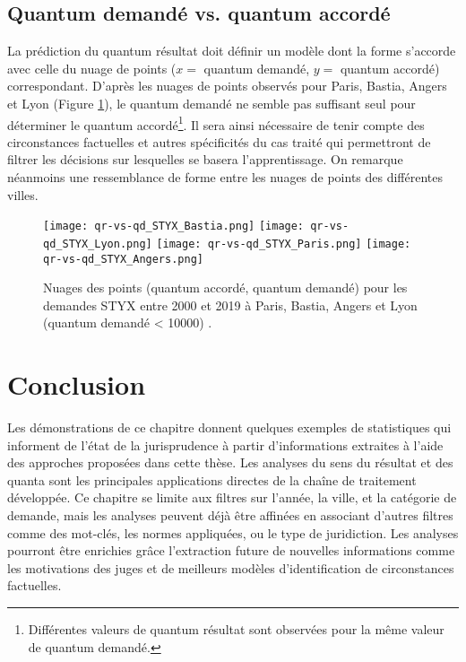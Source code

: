 \subsection{Quantum demandé vs. quantum accordé}
La prédiction du quantum résultat doit définir un modèle dont la forme s'accorde avec celle du nuage de points ($x=$ quantum demandé, $y=$ quantum accordé) correspondant. D'après les nuages de points observés pour Paris, Bastia, Angers et Lyon (Figure \ref{fig:demo:qr-vs-qd-styx-compare-ville}), le quantum demandé ne semble pas suffisant seul pour déterminer le quantum accordé\footnote{Différentes valeurs de quantum résultat sont observées pour la même valeur de quantum demandé.}. Il sera ainsi nécessaire de tenir compte des circonstances factuelles et autres spécificités du cas traité qui permettront de filtrer les décisions sur lesquelles se basera l'apprentissage. On remarque néanmoins une ressemblance de forme entre les nuages de points des différentes villes. 

\begin{figure}[!htb]
	\centering 
	\texttt{[image: qr-vs-qd\_STYX\_Bastia.png]}
	\texttt{[image: qr-vs-qd\_STYX\_Lyon.png]}
	\texttt{[image: qr-vs-qd\_STYX\_Paris.png]}
	\texttt{[image: qr-vs-qd\_STYX\_Angers.png]}
	\caption{Nuages des points (quantum accordé, quantum demandé) pour les demandes STYX entre 2000 et 2019 à Paris, Bastia, Angers et Lyon (quantum demandé < 10000) .}\label{fig:demo:qr-vs-qd-styx-compare-ville}
\end{figure}

\section{Conclusion}
\label{sec:demo:conclusion}
Les démonstrations de ce chapitre donnent quelques exemples de statistiques qui informent de l'état de la jurisprudence à partir d'informations extraites à l'aide des approches proposées dans cette thèse. Les analyses du sens du résultat et des quanta sont les principales applications directes de la chaîne de traitement développée. Ce chapitre se limite aux filtres sur l'année, la ville, et la catégorie de demande, mais les analyses peuvent déjà être affinées en associant d'autres filtres comme  des mot-clés, les normes appliquées, ou le type de juridiction. Les analyses pourront être enrichies grâce l'extraction future de nouvelles informations comme les motivations des juges et de meilleurs modèles d'identification de circonstances factuelles.